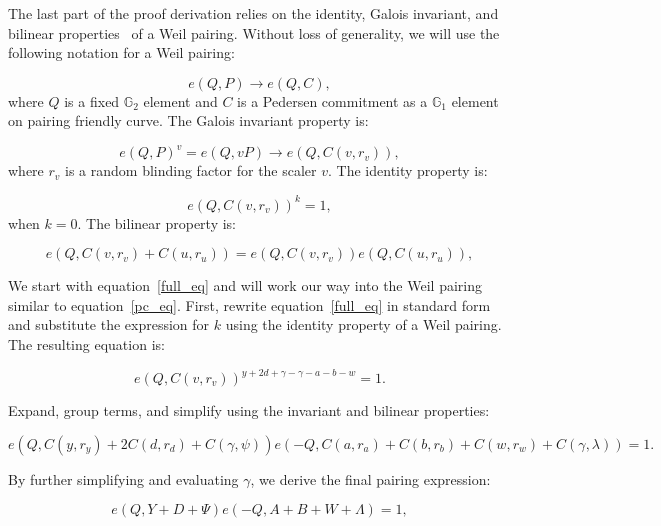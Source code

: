 \documentclass[version=preprint]{iacrcc}
\begin{document}
The last part of the proof derivation relies on the identity, Galois invariant, and bilinear properties~\cite{silverman86} of a Weil pairing. Without loss of generality, we will use the following notation for a Weil pairing:

\begin{equation}
e(Q, P) \rightarrow e(Q, C),
\end{equation}
where \( Q \) is a fixed \( \mathbb{G}_{2} \) element and \(C\) is a Pedersen commitment as a \( \mathbb{G}_{1} \) element on pairing friendly curve. The Galois invariant property is:

\begin{equation}
e{(Q, P)}^{v} = e(Q, v P) \rightarrow e(Q, C(v, r_{v})),
\end{equation}
where $r_{v}$ is a random blinding factor for the scaler $v$. The identity property is:

\begin{equation}
e{(Q, C(v, r_{v}))}^{k} = 1,
\end{equation}
when \( k = 0 \). The bilinear property is:

\begin{equation}
e(Q, C(v, r_{v}) + C(u, r_{u})) = e(Q, C(v, r_{v}))e(Q, C(u, r_{u})),
\end{equation}

We start with equation~\ref{full_eq} and will work our way into the Weil pairing similar to equation~\ref{pc_eq}. First, rewrite equation~\ref{full_eq} in standard form and substitute the expression for \( k \) using the identity property of a Weil pairing. The resulting equation is:

\begin{equation}
e{(Q, C(v, r_{v}))}^{y + 2d + \gamma - \gamma - a - b - w} = 1.
\end{equation}

Expand, group terms, and simplify using the invariant and bilinear properties:

\begin{equation}
e(Q, C(y, r_{y}) + 2 C(d, r_{d}) + C(\gamma, \psi))e(-Q, C(a, r_{a}) + C(b, r_{b}) + C(w, r_{w}) + C(\gamma, \lambda)) = 1.
\end{equation}

By further simplifying and evaluating \( \gamma \), we derive the final pairing expression:

\begin{equation}
e(Q, Y + D + \Psi)e(-Q, A + B + W + \Lambda) = 1,
\end{equation}
\end{document}
